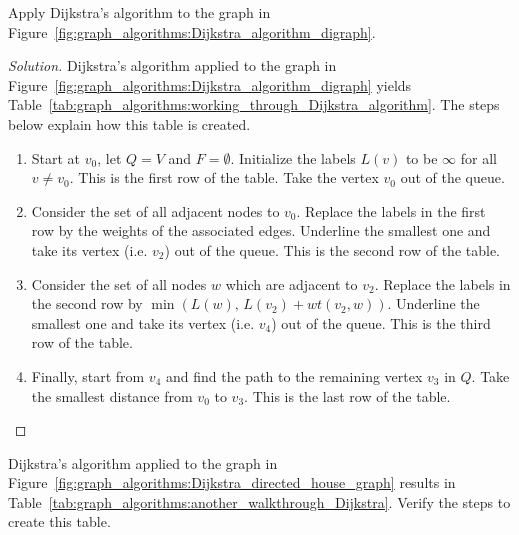 \begin{example}
Apply Dijkstra's algorithm to the graph in
Figure~\ref{fig:graph_algorithms:Dijkstra_algorithm_digraph}.
\end{example}

\begin{proof}[Solution]
Dijkstra's algorithm applied to the graph in
Figure~\ref{fig:graph_algorithms:Dijkstra_algorithm_digraph} yields
Table~\ref{tab:graph_algorithms:working_through_Dijkstra_algorithm}. The
steps below explain how this table is created.
%
\begin{enumerate}
\item
Start at $v_0$, let $Q = V$ and $F = \emptyset$. Initialize the labels
$L(v)$ to be $\infty$ for all $v \neq v_0$. This is the first row of
the table. Take the vertex $v_0$ out of the queue.

\item
Consider the set of all adjacent nodes to $v_0$. Replace the labels in
the first row by the weights of the associated edges. Underline the
smallest one and take its vertex (i.e. $v_2$) out of the queue. This
is the second row of the table.

\item
Consider the set of all nodes $w$ which are adjacent to $v_2$. Replace
the labels in the second row by $\min(L(w),\, L(v_2) + wt(v_2, w))$.
Underline the smallest one and take its vertex (i.e. $v_4$) out of the
queue. This is the third row of the table.

\item
Finally, start from $v_4$ and find the path to the remaining vertex
$v_3$ in $Q$. Take the smallest distance from $v_0$ to $v_3$. This is
the last row of the table.
\end{enumerate}
\end{proof}

\begin{exercise}
Dijkstra's algorithm applied to the graph in
Figure~\ref{fig:graph_algorithms:Dijkstra_directed_house_graph}
results in
Table~\ref{tab:graph_algorithms:another_walkthrough_Dijkstra}. Verify
the steps to create this table.
\end{exercise}

